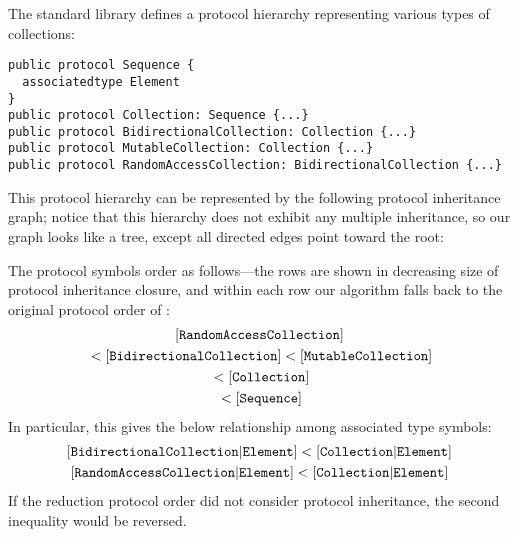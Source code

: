 \documentclass[../generics]{subfiles}
\begin{document}
\begin{example}
The standard library defines a protocol hierarchy representing various types of collections:
\begin{Verbatim}
public protocol Sequence {
  associatedtype Element
}
public protocol Collection: Sequence {...}
public protocol BidirectionalCollection: Collection {...}
public protocol MutableCollection: Collection {...}
public protocol RandomAccessCollection: BidirectionalCollection {...}
\end{Verbatim}
This protocol hierarchy can be represented by the following protocol inheritance graph; notice that this hierarchy does not exhibit any multiple inheritance, so our graph looks like a tree, except all directed edges point toward the root:
\begin{quote}
\end{quote}
The protocol symbols order as follows---the rows are shown in decreasing size of protocol inheritance closure, and within each row our algorithm falls back to the original protocol order of :
\begin{gather*}
[\texttt{RandomAccessCollection}]\\
{} < [\texttt{BidirectionalCollection}]<[\texttt{MutableCollection}]\\
{} < [\texttt{Collection}]\\
{} < [\texttt{Sequence}]
\end{gather*}
In particular, this gives the below relationship among associated type symbols:
\begin{gather*}
\assocsym{BidirectionalCollection}{Element} < \assocsym{Collection}{Element}\\
\assocsym{RandomAccessCollection}{Element} < \assocsym{Collection}{Element}
\end{gather*}
If the reduction protocol order did not consider protocol inheritance, the second inequality would be reversed.
\end{example}
\end{document}
